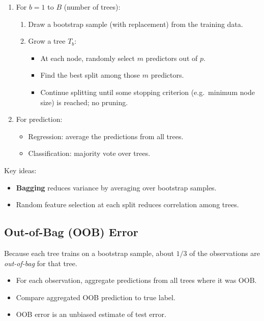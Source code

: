 \documentclass[11pt]{article}
\begin{document}
\begin{enumerate}
    \item For $b = 1$ to $B$ (number of trees):
    \begin{enumerate}
        \item Draw a bootstrap sample (with replacement) from the training data.
        \item Grow a tree $T_b$:
        \begin{itemize}
            \item At each node, randomly select $m$ predictors out of $p$.
            \item Find the best split among those $m$ predictors.
            \item Continue splitting until some stopping criterion (e.g.\ minimum node size) is reached; no pruning.
        \end{itemize}
    \end{enumerate}
    \item For prediction:
    \begin{itemize}
        \item Regression: average the predictions from all trees.
        \item Classification: majority vote over trees.
    \end{itemize}
\end{enumerate}

Key ideas:
\begin{itemize}
    \item \textbf{Bagging} reduces variance by averaging over bootstrap samples.
    \item Random feature selection at each split reduces correlation among trees.
\end{itemize}

\subsection{Out-of-Bag (OOB) Error}

Because each tree trains on a bootstrap sample, about $1/3$ of the observations are \emph{out-of-bag} for that tree.

\begin{itemize}
    \item For each observation, aggregate predictions from all trees where it was OOB.
    \item Compare aggregated OOB prediction to true label.
    \item OOB error is an unbiased estimate of test error.
\end{itemize}
\end{document}
